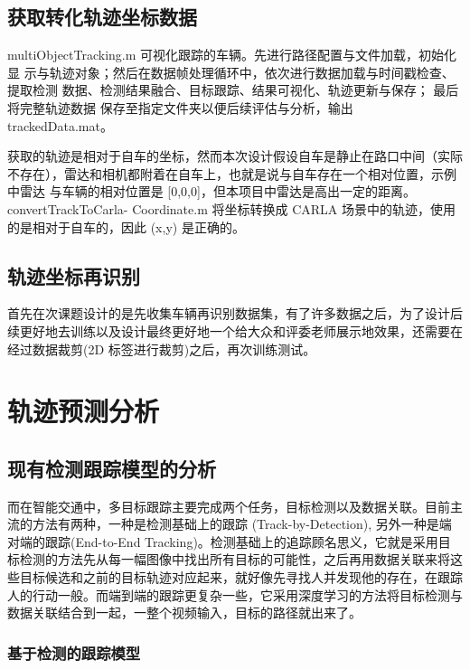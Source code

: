 \subsection{获取转化轨迹坐标数据}

multiObjectTracking.m 可视化跟踪的车辆。先进行路径配置与文件加载，初始化显 示与轨迹对象；然后在数据帧处理循环中，依次进行数据加载与时间戳检查、提取检测 数据、检测结果融合、目标跟踪、结果可视化、轨迹更新与保存； 最后将完整轨迹数据 保存至指定文件夹以便后续评估与分析，输出 trackedData.mat。

获取的轨迹是相对于自车的坐标，然而本次设计假设自车是静止在路口中间（实际 不存在），雷达和相机都附着在自车上，也就是说与自车存在一个相对位置，示例中雷达 与车辆的相对位置是 [0,0,0]，但本项目中雷达是高出一定的距离。convertTrackToCarla- Coordinate.m 将坐标转换成 CARLA 场景中的轨迹，使用的是相对于自车的，因此 (x,y) 是正确的。

\subsection{轨迹坐标再识别}

首先在次课题设计的是先收集车辆再识别数据集，有了许多数据之后，为了设计后续更好地去训练以及设计最终更好地一个给大众和评委老师展示地效果，还需要在经过数据裁剪(2D 标签进行裁剪)之后，再次训练测试。



\section{轨迹预测分析}



\subsection{现有检测跟踪模型的分析}


而在智能交通中，多目标跟踪主要完成两个任务，目标检测以及数据关联。目前主流的方法有两种，一种是检测基础上的跟踪 (Track-by-Detection), 另外一种是端对端的跟踪(End-to-End Tracking)。检测基础上的追踪顾名思义，它就是采用目标检测的方法先从每一幅图像中找出所有目标的可能性，之后再用数据关联来将这些目标候选和之前的目标轨迹对应起来，就好像先寻找人并发现他的存在，在跟踪人的行动一般。而端到端的跟踪更复杂一些，它采用深度学习的方法将目标检测与数据关联结合到一起，一整个视频输入，目标的路径就出来了。


\subsubsection{基于检测的跟踪模型}


